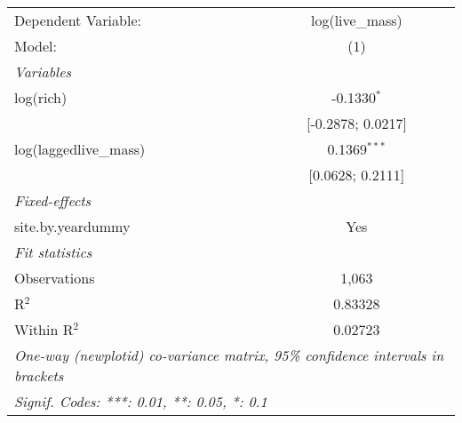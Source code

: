 \begin{tabular}{lc}
\tabularnewline\midrule\midrule
Dependent Variable:&log(live\_mass)\\
Model:&(1)\\
\midrule \emph{Variables}&  \\
log(rich)&-0.1330$^{*}$\\
  &[-0.2878; 0.0217]\\
log(laggedlive\_mass)&0.1369$^{***}$\\
  &[0.0628; 0.2111]\\
\midrule \emph{Fixed-effects}&  \\
site.by.yeardummy & Yes\\
\midrule \emph{Fit statistics}&  \\
Observations & 1,063\\
R$^2$ & 0.83328\\
Within R$^2$ & 0.02723\\
\midrule\midrule\multicolumn{2}{l}{\emph{One-way (newplotid) co-variance matrix, 95\% confidence intervals in brackets}}\\
\multicolumn{2}{l}{\emph{Signif. Codes: ***: 0.01, **: 0.05, *: 0.1}}\\
\end{tabular}


